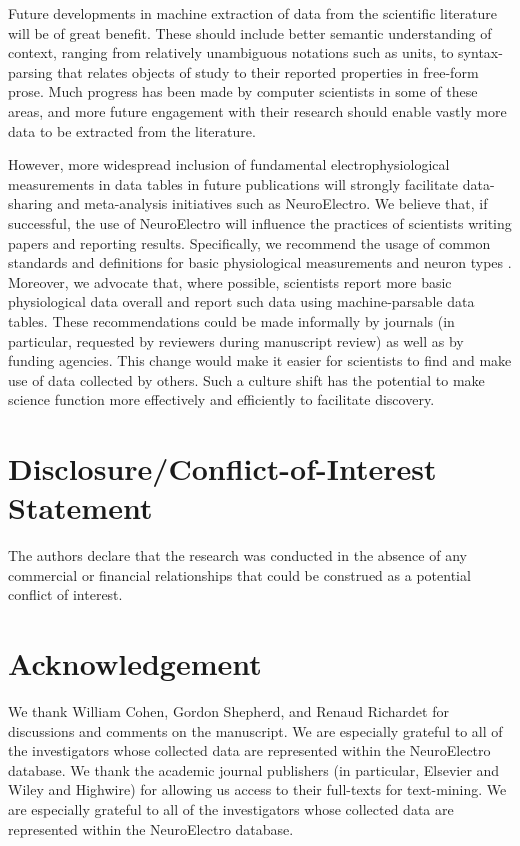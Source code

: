\documentclass{template/frontiersSCNS} %
\begin{document}
Future developments in machine extraction of data from the scientific literature will be of great benefit.  
These should include better semantic understanding of context, ranging from relatively unambiguous notations such as units, to syntax-parsing that relates objects of study to their reported properties in free-form prose.  
Much progress has been made by computer scientists in some of these areas, and more future engagement with their research should enable vastly more data to be extracted from the literature.  

However, more widespread inclusion of fundamental electrophysiological measurements in data tables in future publications will strongly facilitate data-sharing and meta-analysis initiatives such as NeuroElectro.  
We believe that, if successful, the use of NeuroElectro will influence the practices of scientists writing papers and reporting results.  
Specifically, we recommend the usage of common standards and definitions for basic physiological measurements \citep{toledo-rodriguez_correlation_2004} and neuron types \citep{ascoli_petilla_2008,larson_neurolex.org:_2013}.  
Moreover, we advocate that, where possible, scientists report more basic physiological data overall and report such data using machine-parsable data tables.  
These recommendations could be made informally by journals (in particular, requested by reviewers during manuscript review) as well as by funding agencies.
This change would make it easier for scientists to find and make use of data collected by others.  
Such a culture shift has the potential to make science function more effectively and efficiently to facilitate discovery.   

\section*{Disclosure/Conflict-of-Interest Statement}
The authors declare that the research was conducted in the absence of any commercial or financial relationships that could be construed as a potential conflict of interest.

\section*{Acknowledgement}
We thank William Cohen, Gordon Shepherd, and Renaud Richardet for discussions and comments on the manuscript. 
We are especially grateful to all of the investigators whose collected data are represented within the NeuroElectro database.  
We thank the academic journal publishers (in particular, Elsevier and Wiley and Highwire) for allowing us access to their full-texts for text-mining.  
We are especially grateful to all of the investigators whose collected data are represented within the NeuroElectro database.
\end{document}
